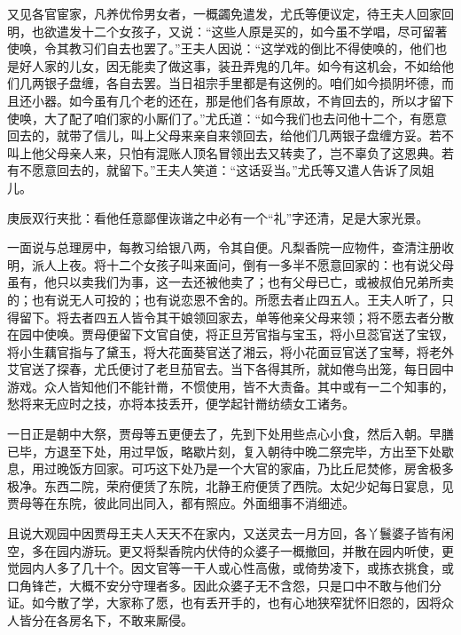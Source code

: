 \begin{parag}
    又见各官宦家，凡养优伶男女者，一概蠲免遣发，尤氏等便议定，待王夫人回家回明，也欲遣发十二个女孩子，又说：“这些人原是买的，如今虽不学唱，尽可留著使唤，令其教习们自去也罢了。”王夫人因说：“这学戏的倒比不得使唤的，他们也是好人家的儿女，因无能卖了做这事，装丑弄鬼的几年。如今有这机会，不如给他们几两银子盘缠，各自去罢。当日祖宗手里都是有这例的。咱们如今损阴坏德，而且还小器。如今虽有几个老的还在，那是他们各有原故，不肯回去的，所以才留下使唤，大了配了咱们家的小厮们了。”尤氏道：“如今我们也去问他十二个，有愿意回去的，就带了信儿，叫上父母来亲自来领回去，给他们几两银子盘缠方妥。若不叫上他父母亲人来，只怕有混账人顶名冒领出去又转卖了，岂不辜负了这恩典。若有不愿意回去的，就留下。”王夫人笑道：“这话妥当。”尤氏等又遣人告诉了凤姐儿。\begin{note}庚辰双行夹批：看他任意鄙俚诙谐之中必有一个“礼”字还清，足是大家光景。\end{note}一面说与总理房中，每教习给银八两，令其自便。凡梨香院一应物件，查清注册收明，派人上夜。将十二个女孩子叫来面问，倒有一多半不愿意回家的：也有说父母虽有，他只以卖我们为事，这一去还被他卖了；也有父母已亡，或被叔伯兄弟所卖的；也有说无人可投的；也有说恋恩不舍的。所愿去者止四五人。王夫人听了，只得留下。将去者四五人皆令其干娘领回家去，单等他亲父母来领；将不愿去者分散在园中使唤。贾母便留下文官自使，将正旦芳官指与宝玉，将小旦蕊官送了宝钗，将小生藕官指与了黛玉，将大花面葵官送了湘云，将小花面豆官送了宝琴，将老外艾官送了探春，尤氏便讨了老旦茄官去。当下各得其所，就如倦鸟出笼，每日园中游戏。众人皆知他们不能针黹，不惯使用，皆不大责备。其中或有一二个知事的，愁将来无应时之技，亦将本技丢开，便学起针黹纺绩女工诸务。
\end{parag}


\begin{parag}
    一日正是朝中大祭，贾母等五更便去了，先到下处用些点心小食，然后入朝。早膳已毕，方退至下处，用过早饭，略歇片刻，复入朝待中晚二祭完毕，方出至下处歇息，用过晚饭方回家。可巧这下处乃是一个大官的家庙，乃比丘尼焚修，房舍极多极净。东西二院，荣府便赁了东院，北静王府便赁了西院。太妃少妃每日宴息，见贾母等在东院，彼此同出同入，都有照应。外面细事不消细述。
\end{parag}


\begin{parag}
    且说大观园中因贾母王夫人天天不在家内，又送灵去一月方回，各丫鬟婆子皆有闲空，多在园内游玩。更又将梨香院内伏侍的众婆子一概撤回，并散在园内听使，更觉园内人多了几十个。因文官等一干人或心性高傲，或倚势凌下，或拣衣挑食，或口角锋芒，大概不安分守理者多。因此众婆子无不含怨，只是口中不敢与他们分证。如今散了学，大家称了愿，也有丢开手的，也有心地狭窄犹怀旧怨的，因将众人皆分在各房名下，不敢来厮侵。
\end{parag}



